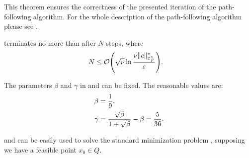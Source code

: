 This theorem ensures the correctness of the presented iteration of the path-following algorithm.
For the whole description of the path-following algorithm please see .



\begin{theorem}
   terminates no more than after $N$ steps, where
  \begin{align}
    N &\leq \mathcal{O}\Bigg(\sqrt{\nu}\ln\frac{\nu \|c\|^*_{x^*_F}}{\varepsilon}\Bigg).\labeleq{SDP:scb:pfSteps}
  \end{align}
\end{theorem}

The parameters $\beta$ and $\gamma$ in  and  can be fixed. The reasonable values are:
\begin{align}
  \beta &= \frac{1}{9},\labeleq{SDP:scb:beta}\\
  \gamma &= \frac{\sqrt{\beta}}{1+\sqrt{\beta}} - \beta = \frac{5}{36}.\labeleq{SDP:scb:gamma}
\end{align}

 and  can be easily used to solve the standard minimization problem , supposing we have a feasible point $x_0\in Q$.

